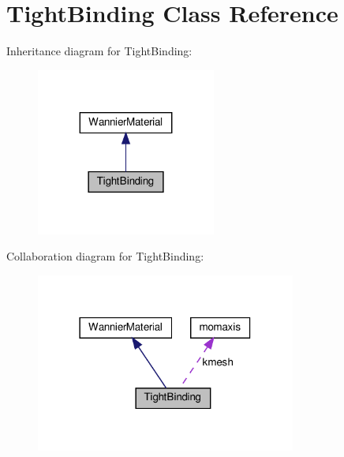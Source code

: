 \hypertarget{class_tight_binding}{}\section{Tight\+Binding Class Reference}
\label{class_tight_binding}


Inheritance diagram for Tight\+Binding\+:\nopagebreak
\begin{figure}[H]
\begin{center}
\leavevmode
\includegraphics[width=167pt]{class_tight_binding__inherit__graph}
\end{center}
\end{figure}


Collaboration diagram for Tight\+Binding\+:
\nopagebreak
\begin{figure}[H]
\begin{center}
\leavevmode
\includegraphics[width=242pt]{class_tight_binding__coll__graph}
\end{center}
\end{figure}
